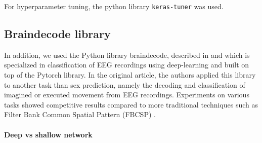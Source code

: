 

For hyperparameter tuning, the python library \texttt{keras-tuner} was used. 

\subsection{Braindecode library}

In addition, we used the Python library braindecode, described in \cite{Schirrmeister2017} and which is specialized in classification of EEG recordings using deep-learning and built on top of the Pytorch library. In the original article, the authors applied this library to another task than sex prediction, namely the decoding and classification of imagined or executed movement from EEG recordings. Experiments on various tasks showed competitive results compared to more traditional techniques such as Filter Bank Common Spatial Pattern (FBCSP) \cite{Ang2008}.

\paragraph{Deep vs shallow network} 

